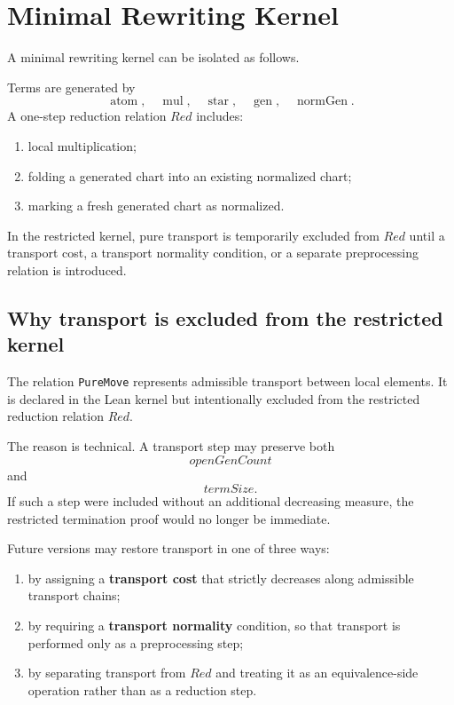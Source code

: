 \documentclass[11pt]{article}
\begin{document}
\section{Minimal Rewriting Kernel}
\label{sec:minimal-rewriting-kernel}

A minimal rewriting kernel can be isolated as follows.

Terms are generated by
\[
\operatorname{atom},\quad \operatorname{mul},\quad \operatorname{star},\quad \operatorname{gen},\quad \operatorname{normGen}.
\]
A one-step reduction relation $Red$ includes:
\begin{enumerate}
  \item local multiplication;
  \item folding a generated chart into an existing normalized chart;
  \item marking a fresh generated chart as normalized.
\end{enumerate}

In the restricted kernel, pure transport is temporarily excluded from $Red$ until a transport cost, a transport normality condition, or a separate preprocessing relation is introduced.

\subsection*{Why transport is excluded from the restricted kernel}

The relation \texttt{PureMove} represents admissible transport between local elements. It is declared in the Lean kernel but intentionally excluded from the restricted reduction relation $Red$.

The reason is technical. A transport step may preserve both
\[
openGenCount
\]
and
\[
termSize.
\]
If such a step were included without an additional decreasing measure, the restricted termination proof would no longer be immediate.

Future versions may restore transport in one of three ways:
\begin{enumerate}
  \item by assigning a \textbf{transport cost} that strictly decreases along admissible transport chains;
  \item by requiring a \textbf{transport normality} condition, so that transport is performed only as a preprocessing step;
  \item by separating transport from $Red$ and treating it as an equivalence-side operation rather than as a reduction step.
\end{enumerate}
\end{document}
